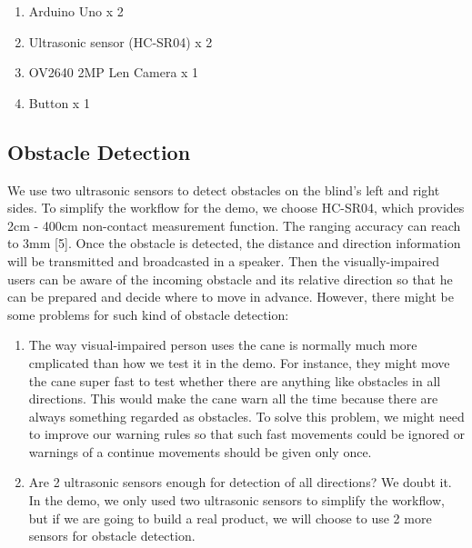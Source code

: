 \begin{enumerate}
  \item Arduino Uno x 2
  \item Ultrasonic sensor (HC-SR04) x 2
  \item OV2640 2MP Len Camera x 1
  \item Button x 1
\end{enumerate}

\subsection{Obstacle Detection}
We use two ultrasonic sensors to detect obstacles on the blind’s left and right sides. 
To simplify the workflow for the demo, we choose HC-SR04, which provides 2cm - 400cm non-contact measurement function. 
The ranging accuracy can reach to 3mm [5]. Once the obstacle is detected, the distance and direction information will be transmitted and broadcasted in a speaker. 
Then the visually-impaired users can be aware of the incoming obstacle and its relative direction so that he can be prepared and decide where to move in advance.
\newline
However, there might be some problems for such kind of obstacle detection:
\begin{enumerate}
\item The way visual-impaired person uses the cane is normally much more cmplicated than how we test it in the demo.
For instance, they might move the cane super fast to test whether there are anything like obstacles in all directions.
This would make the cane warn all the time because there are always something regarded as obstacles.
\newline
To solve this problem, we might need to improve our warning rules so that such fast movements could be ignored or warnings of a continue movements should be given only once.
\item Are 2 ultrasonic sensors enough for detection of all directions? 
\newline
We doubt it. In the demo, we only used two ultrasonic sensors
to simplify the workflow, but if we are going to build a real product, we will choose to use 2 more sensors for obstacle detection.
\end{enumerate}

